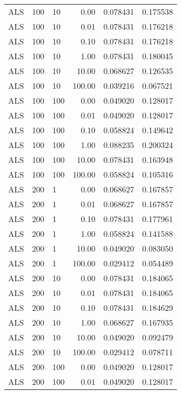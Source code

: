 \begin{tabular}{lllrrr}
  ALS &  100 &     10 &    0.00 &     0.078431 &  0.175538 \\
  ALS &  100 &     10 &    0.01 &     0.078431 &  0.176218 \\
  ALS &  100 &     10 &    0.10 &     0.078431 &  0.176218 \\
  ALS &  100 &     10 &    1.00 &     0.078431 &  0.180045 \\
  ALS &  100 &     10 &   10.00 &     0.068627 &  0.126535 \\
  ALS &  100 &     10 &  100.00 &     0.039216 &  0.067521 \\
  ALS &  100 &    100 &    0.00 &     0.049020 &  0.128017 \\
  ALS &  100 &    100 &    0.01 &     0.049020 &  0.128017 \\
  ALS &  100 &    100 &    0.10 &     0.058824 &  0.149642 \\
  ALS &  100 &    100 &    1.00 &     0.088235 &  0.200324 \\
  ALS &  100 &    100 &   10.00 &     0.078431 &  0.163948 \\
  ALS &  100 &    100 &  100.00 &     0.058824 &  0.105316 \\
  ALS &  200 &      1 &    0.00 &     0.068627 &  0.167857 \\
  ALS &  200 &      1 &    0.01 &     0.068627 &  0.167857 \\
  ALS &  200 &      1 &    0.10 &     0.078431 &  0.177961 \\
  ALS &  200 &      1 &    1.00 &     0.058824 &  0.141588 \\
  ALS &  200 &      1 &   10.00 &     0.049020 &  0.083050 \\
  ALS &  200 &      1 &  100.00 &     0.029412 &  0.054489 \\
  ALS &  200 &     10 &    0.00 &     0.078431 &  0.184065 \\
  ALS &  200 &     10 &    0.01 &     0.078431 &  0.184065 \\
  ALS &  200 &     10 &    0.10 &     0.078431 &  0.184629 \\
  ALS &  200 &     10 &    1.00 &     0.068627 &  0.167935 \\
  ALS &  200 &     10 &   10.00 &     0.049020 &  0.092479 \\
  ALS &  200 &     10 &  100.00 &     0.029412 &  0.078711 \\
  ALS &  200 &    100 &    0.00 &     0.049020 &  0.128017 \\
  ALS &  200 &    100 &    0.01 &     0.049020 &  0.128017 \\

\end{tabular}
